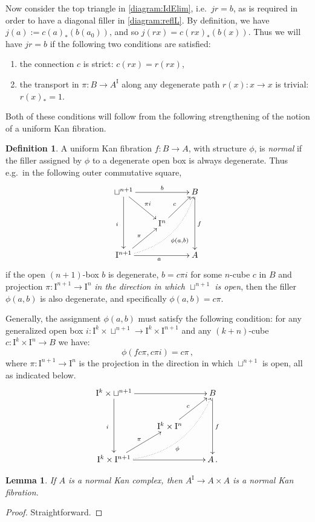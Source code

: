 \documentclass[12pt]{article}
\newcommand{\I}{\ensuremath{\mathrm{I}}}
\newcommand{\pA}{\ensuremath{A^\I}}
\newtheorem{lemma}[theorem]{Lemma}
\theoremstyle{remark}
\theoremstyle{definition}
\newtheorem{definition}[theorem]{Definition}
\begin{document}
Now consider the top triangle in \eqref{diagram:IdElim}, i.e.\ $jr=b$, as is required in order to have a diagonal filler in \eqref{diagram:reflL}.  By definition, we have $j(a) := c(a)_*(b(a_0))$, and so $j(rx) = c(rx)_*(b(x))$.  Thus we will have $jr=b$ if the following two conditions are satisfied:
\begin{enumerate}
\item the connection $c$ is strict: $c(rx) = r(rx)$,
\item the transport in $\pi : B \to \pA$ along any degenerate path $r(x) : x\to x$ is trivial: $r(x)_* = 1$.
\end{enumerate}

Both of these conditions will follow from the following strengthening of the notion of a uniform Kan fibration.

\begin{definition}
A uniform Kan fibration $f:B\to A$, with structure $\phi$, is \emph{normal} if the filler assigned by $\phi$ to a degenerate open box is always degenerate.  Thus e.g.\  in the following outer commutative square,
\[
\xymatrix{
\sqcup^{n+1} \ar[dd]_{i\ }\ar[rr]^-{b} \ar[rd]^{\pi i} && B \ar[dd]^{f} \\
& \I^n \ar[ru]^{c} & \\
\I^{n+1} \ar[ru]^\pi \ar[rr]_a \ar@/{}_{1.5pc}/@{..>}[rruu]_{\phi(a,b)} && A
}
\]
if the open $(n+1)$-box $b$ is degenerate, $b=c\pi i$ for some $n$-cube $c$ in $B$ and projection $\pi: \I^{n+1} \to \I^{n}$ \emph{in the direction in which $\sqcup^{n+1}$ is open},  then the filler $\phi(a,b)$ is also degenerate, and specifically $\phi(a,b) = c\pi$.  

Generally, the assignment $\phi(a,b)$ must satisfy the following condition: for any generalized open box $i : \I^k\times\sqcup^{n+1}\to \I^k\times\I^{n+1}$ and any $(k+n)$-cube $c : \I^k\times \I^n \to B$ we have:
\[
\phi(fc\pi, c\pi i) = c\pi\,,
\]
where $\pi: \I^{n+1} \to \I^{n}$ is the projection in the direction in which $\sqcup^{n+1}$ is open, all as indicated below.
\[
\xymatrix{
\I^k\times\sqcup^{n+1} \ar[dd]_{i\ } \ar[rr] && B \ar[dd]^{f} \\
& \I^k\times\I^n \ar[ru]^{c} & \\
\I^k\times\I^{n+1} \ar[ru]^\pi \ar[rr] \ar@/{}_{2pc}/@{..>}[rruu]_{\phi} && A\,.
}
\]
\end{definition}

\begin{lemma}\label{lem:normalpath}
If $A$ is a normal Kan complex, then $\pA \to A\times A$ is a normal Kan fibration.
\end{lemma}
\begin{proof}
Straightforward.
\end{proof}
\end{document}
